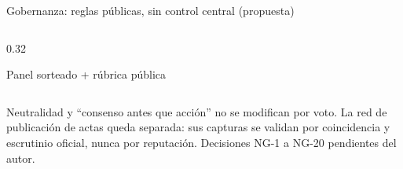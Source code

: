 \documentclass[aspectratio=169,11pt]{beamer}
\begin{document}
\begin{frame}{Gobernanza: reglas públicas, sin control central (propuesta)}
\begin{columns}[T]
\begin{column}{0.32\textwidth}
\begin{block}{Panel sorteado + rúbrica pública}
\begin{itemize}
        \end{itemize}
      \end{block}
    \end{column}
  \end{columns}
  \vspace{2pt}
  \begin{center}
  \end{center}
  {\scriptsize\color{ccmuted} Neutralidad y ``consenso antes que acción'' no se modifican por voto. La red de publicación de actas queda separada:
  sus capturas se validan por coincidencia y escrutinio oficial, nunca por reputación. Decisiones NG-1 a NG-20 pendientes del autor.}
\end{frame}
\end{document}
